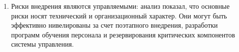 \begin{enumerate}[beginpenalty=10000, midpenalty=10000, wide=\parindent, leftmargin=0pt]
\item Риски внедрения являются управляемыми: анализ показал, что основные риски носят технический и организационный характер. Они могут быть эффективно нивелированы за счет поэтапного внедрения, разработки программ обучения персонала и резервирования критических компонентов системы управления.

\end{enumerate}

\FloatBarrier
